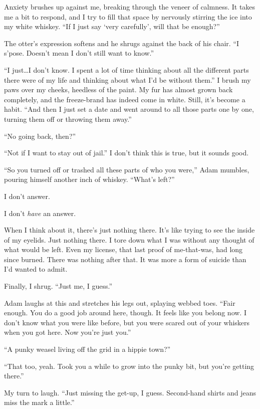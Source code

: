 Anxiety brushes up against me, breaking through the veneer of calmness. It takes me a bit to respond, and I try to fill that space by nervously stirring the ice into my white whiskey. ``If I just say `very carefully', will that be enough?''

The otter's expression softens and he shrugs against the back of his chair. ``I s'pose. Doesn't mean I don't still want to know.''

``I just\ldots{}I don't know. I spent a lot of time thinking about all the different parts there were of my life and thinking about what I'd be without them.'' I brush my paws over my cheeks, heedless of the paint. My fur has almost grown back completely, and the freeze-brand has indeed come in white. Still, it's become a habit. ``And then I just set a date and went around to all those parts one by one, turning them off or throwing them away.''

``No going back, then?''

``Not if I want to stay out of jail.'' I don't think this is true, but it sounds good.

``So you turned off or trashed all these parts of who you were,'' Adam mumbles, pouring himself another inch of whiskey. ``What's left?''

I don't answer.

I don't \emph{have} an answer.

When I think about it, there's just nothing there. It's like trying to see the inside of my eyelids. Just nothing there. I tore down what I was without any thought of what would be left. Even my license, that last proof of me-that-was, had long since burned. There was nothing after that. It was more a form of suicide than I'd wanted to admit.

Finally, I shrug. ``Just me, I guess.''

Adam laughs at this and stretches his legs out, splaying webbed toes. ``Fair enough. You do a good job around here, though. It feels like you belong now. I don't know what you were like before, but you were scared out of your whiskers when you got here. Now you're just you.''

``A punky weasel living off the grid in a hippie town?''

``That too, yeah. Took you a while to grow into the punky bit, but you're getting there.''

My turn to laugh. ``Just missing the get-up, I guess. Second-hand shirts and jeans miss the mark a little.''

